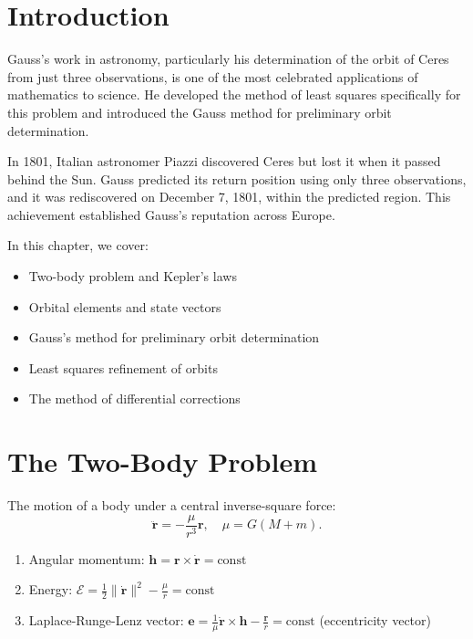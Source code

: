 \section{Introduction}

Gauss's work in astronomy, particularly his determination of the orbit of Ceres from just three observations, is one of the most celebrated applications of mathematics to science. He developed the method of least squares specifically for this problem and introduced the Gauss method for preliminary orbit determination.

In 1801, Italian astronomer Piazzi discovered Ceres but lost it when it passed behind the Sun. Gauss predicted its return position using only three observations, and it was rediscovered on December 7, 1801, within the predicted region. This achievement established Gauss's reputation across Europe.

In this chapter, we cover:
\begin{itemize}
    \item Two-body problem and Kepler's laws
    \item Orbital elements and state vectors
    \item Gauss's method for preliminary orbit determination
    \item Least squares refinement of orbits
    \item The method of differential corrections
\end{itemize}

\section{The Two-Body Problem}

The motion of a body under a central inverse-square force:
\[
\ddot{\mathbf{r}} = -\frac{\mu}{r^3} \mathbf{r}, \quad \mu = G(M+m).
\]

\begin{theorem}
\begin{enumerate}
    \item Angular momentum: $\mathbf{h} = \mathbf{r} \times \dot{\mathbf{r}} = \text{const}$
    \item Energy: $\mathcal{E} = \frac{1}{2} \|\dot{\mathbf{r}}\|^2 - \frac{\mu}{r} = \text{const}$
    \item Laplace-Runge-Lenz vector: $\mathbf{e} = \frac{1}{\mu} \dot{\mathbf{r}} \times \mathbf{h} - \frac{\mathbf{r}}{r} = \text{const}$ (eccentricity vector)
\end{enumerate}
\end{theorem}

